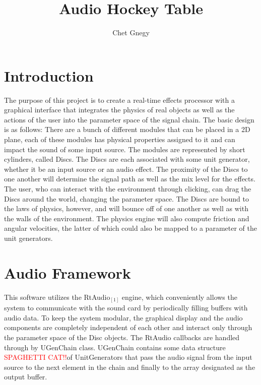 \documentclass[pdftext,twoside,10pt]{article}
\title{Audio Hockey Table}
\author{Chet Gnegy}
\newcommand{\spag}{\textcolor{red}{SPAGHETTI CAT!!}}
\begin{document}
\maketitle

\section{Introduction}
The purpose of this project is to create a real-time effects processor with a graphical interface that integrates the physics of real objects as well as the actions of the user into the parameter space of the signal chain. The basic design is as follows: There are a bunch of different modules that can be placed in a 2D plane, each of these modules has physical properties assigned to it and can impact the sound of some input source. The modules are represented by short cylinders, called Discs. The Discs are each associated with some unit generator, whether it be an input source or an audio effect. The proximity of the Discs to one another will determine the signal path as well as the mix level for the effects. The user, who can interact with the environment through clicking, can drag the Discs around the world, changing the parameter space. The Discs are bound to the laws of physics, however, and will bounce off of one another as well as with the walls of the environment. The physics engine will also compute friction and angular velocities, the latter of which could also be mapped to a parameter of the unit generators.

\section{Audio Framework}

This software utilizes the RtAudio$_{[1]}$ engine, which conveniently allows the system to communicate with the sound card by periodically filling buffers with audio data. To keep the system modular, the graphical display and the audio components are completely independent of each other and interact only through the parameter space of the Disc objects. The RtAudio callbacks are handled through by UGenChain class. UGenChain contains some data structure \spag of UnitGenerators that pass the audio signal from the input source to the next element in the chain and finally to the array designated as the output buffer. 
\end{document}
